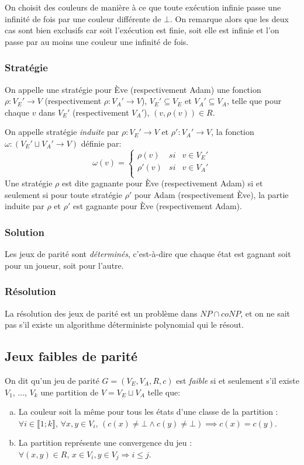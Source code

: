 \documentclass[10pt,a4paper]{article}
\begin{document}
On choisit des couleurs de manière à ce que toute exécution infinie passe une infinité de fois par une couleur différente de $\bot$. On remarque alors que les deux cas sont bien exclusifs car soit l'exécution est finie, soit elle est infinie et l'on passe par au moins une couleur une infinité de fois.

\subsubsection{Stratégie}
On appelle une stratégie pour Ève (respectivement Adam) une fonction $\rho : V_E' \to V$ (respectivement $\rho : V_A' \to V$), $V_E' \subseteq V_E$ et $V_A' \subseteq V_A$, telle que pour chaque $v$ dans $V_E'$ (respectivement $V_A'$), $(v, \rho(v)) \in R$.

On appelle stratégie \emph{induite} par $\rho : V_E' \to V$ et $\rho' : V_A' \to V$, la fonction $\omega : (V_E' \sqcup V_A' \to V)$ définie par:
\\
$$\omega(v) = \left \{
\begin{array}{rcl}
\rho(v) & si & v \in V_E'\\
\rho'(v) & si & v \in V_A'\\
\end{array}
\right .$$
Une stratégie $\rho$ est dite gagnante pour Ève (respectivement Adam) si et seulement si pour toute stratégie $\rho'$ pour Adam (respectivement Ève), la partie induite par $\rho$ et $\rho'$ est gagnante pour Ève (respectivement Adam).

\subsubsection{Solution}
Les jeux de parité sont \emph{déterminés}, c'est-à-dire que chaque état est gagnant soit pour un joueur, soit pour l'autre.

\subsubsection{Résolution}
La résolution des jeux de parité est un problème dans $NP \cap coNP$, et on ne sait pas s'il existe un algorithme déterministe polynomial qui le résout.

\subsection{Jeux faibles de parité}
\label{fpg}

On dit qu'un jeu de parité $G = (V_E,V_A,R,c)$ est \emph{faible}  si et seulement s'il existe $V_1$, ..., $V_k$ une partition de $V = V_E \sqcup V_A$ telle que:
\begin{enumerate}[a)]
\item La couleur soit la même pour tous les états d'une classe de la partition : $\forall i \in \llbracket 1 ; k \rrbracket$, $\forall x, y \in V_i$, $(c(x) \neq \bot \land c(y) \neq \bot)  \implies c(x) = c(y)$.
\item La partition représente une convergence du jeu :\\
$\forall (x, y) \in R$, $x\in V_i, y \in V_j \Rightarrow i \leq j$.
\end{enumerate}
\end{document}
